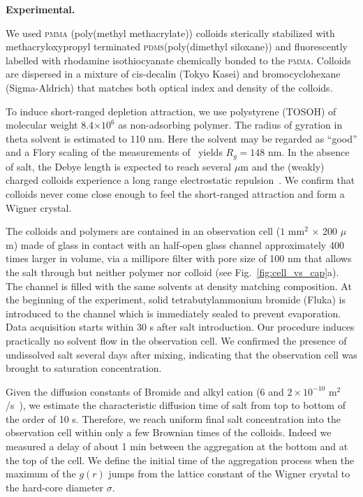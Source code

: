 \documentclass[preprint,footinbib,amsmath,amssymb]{revtex4}
\begin{document}
\vspace{0.5cm}
\noindent
{\bf Experimental.}

We used \textsc{pmma} (poly(methyl methacrylate)) colloids sterically stabilized with methacryloxypropyl terminated \textsc{pdms}(poly(dimethyl siloxane)) and fluorescently labelled with rhodamine isothiocyanate chemically bonded to the \textsc{pmma}. Colloids are dispersed in a mixture of cis-decalin (Tokyo Kasei) and bromocyclohexane (Sigma-Aldrich) that matches both optical index and density of the colloids.

To induce short-ranged depletion attraction, we use polystyrene (TOSOH) of molecular weight 8.4$\times 10^6$ as non-adsorbing polymer. The radius of gyration in theta solvent is estimated to 110 nm. Here the solvent may be regarded as ``good'' and a Flory scaling of the measurements of~\cite{lu2008gelation} yields $R_g=148$ nm. In the absence of salt, the Debye length is expected to reach several $\mu$m and the (weakly) charged colloids experience a long range electrostatic repulsion~\cite{Royall2003}. We confirm that colloids never come close enough to feel the short-ranged attraction and form a Wigner crystal.

The colloids and polymers are contained in an observation cell ($1$ mm$^2$ $\times$ 200 $\mu$m) made of glass in contact with an half-open glass channel approximately 400 times larger in volume, via a millipore filter with pore size of 100 nm that allows the salt through but neither polymer nor colloid (see Fig.~\ref{fig:cell_vs_cap}a). The channel is filled with the same solvents at density matching composition. At the beginning of the experiment, solid tetrabutylammonium bromide (Fluka) is introduced to the channel which is immediately sealed to prevent evaporation. Data acquisition starts within 30 s after salt introduction. Our procedure induces practically no solvent flow in the observation cell. We confirmed the presence of undissolved salt several days after mixing, indicating that the observation cell was brought to saturation concentration.

Given the diffusion constants of Bromide and alkyl cation ($6$ and $2 \times 10^{-10}$ m$^2$/s~\cite{Campbell2005}), we estimate the characteristic diffusion time of salt from top to bottom of the order of 10 s. Therefore, we reach uniform final salt concentration into the observation cell within only a few Brownian times of the colloids. Indeed we measured a delay of about 1 min between the aggregation at the bottom and at the top of the cell. We define the initial time of the aggregation process when the maximum of the $g(r)$ jumps from the lattice constant of the Wigner crystal to the hard-core diameter $\sigma$.
\end{document}
